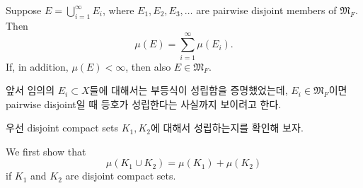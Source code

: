 \documentclass[11pt,reqno]{amsart}
\renewcommand{\(}{\left(}
\renewcommand{\)}{\right)}
\renewcommand{\[}{\left[}
\renewcommand{\]}{\right]}
\newenvironment{textbox}
  {\begin{tcolorbox}[
    colback=gray!10, 
    colframe=gray!50, 
    boxrule=0.5pt,
    fontupper=\normalfont
  ]}
  {\end{tcolorbox}}
\newcommand{\subheading}[1]{\vspace{1em}{\noindent\large\bfseries \textlangle{} #1 \textrangle{} \par}\vspace{1em}}
\newcommand{\M}{\mathfrak{M}}
\begin{document}
\begin{textbox}
  Suppose $\displaystyle E = \bigcup _{i=1}^\infty E_i$, where $E_1, E_2, E_3, \dots$ are 
  pairwise disjoint members of $\M_F$. Then
  \begin{equation}
    \mu(E) = \sum_{i=1}^\infty \mu(E_i).
  \end{equation}
  If, in addition, $\mu (E) < \infty$, then also $E \in \M_F$.
\end{textbox}

앞서 임의의 $E_i \subset X$들에 대해서는 부등식이 성립함을 증명했었는데, $E_i \in \M_F$이면 
pairwise disjoint일 때 등호가 성립한다는 사실까지 보이려고 한다.

\subheading{proof}

우선 disjoint compact sets $K_1, K_2$에 대해서 성립하는지를 확인해 보자.

\begin{textbox}
  We first show that
  \begin{equation}
    \mu(K_1 \cup K_2) = \mu(K_1) + \mu(K_2)
  \end{equation}
  if $K_1$ and $K_2$ are disjoint compact sets.
\end{textbox}
\end{document}
